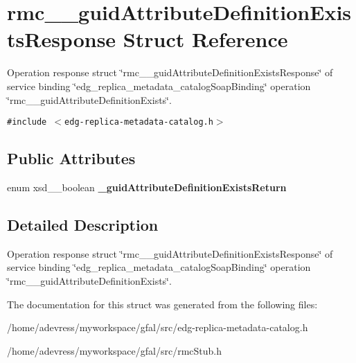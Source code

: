 \section{rmc\_\-\_\-guid\-Attribute\-Definition\-Exists\-Response Struct Reference}
\label{structrmc____guidAttributeDefinitionExistsResponse}
Operation response struct \char`\"{}rmc\_\-\_\-guid\-Attribute\-Definition\-Exists\-Response\char`\"{} of service binding \char`\"{}edg\_\-replica\_\-metadata\_\-catalog\-Soap\-Binding\char`\"{} operation \char`\"{}rmc\_\-\_\-guid\-Attribute\-Definition\-Exists\char`\"{}.  


{\tt \#include $<$edg-replica-metadata-catalog.h$>$}

\subsection*{Public Attributes}
\begin{CompactItemize}
\item 
enum xsd\_\-\_\-boolean \textbf{\_\-guid\-Attribute\-Definition\-Exists\-Return}\label{structrmc____guidAttributeDefinitionExistsResponse_13b5f6da8e8af041cd953c68d846ab7b}

\end{CompactItemize}


\subsection{Detailed Description}
Operation response struct \char`\"{}rmc\_\-\_\-guid\-Attribute\-Definition\-Exists\-Response\char`\"{} of service binding \char`\"{}edg\_\-replica\_\-metadata\_\-catalog\-Soap\-Binding\char`\"{} operation \char`\"{}rmc\_\-\_\-guid\-Attribute\-Definition\-Exists\char`\"{}. 



The documentation for this struct was generated from the following files:\begin{CompactItemize}
\item 
/home/adevress/myworkspace/gfal/src/edg-replica-metadata-catalog.h\item 
/home/adevress/myworkspace/gfal/src/rmc\-Stub.h\end{CompactItemize}
